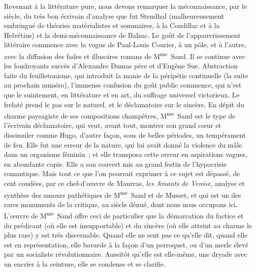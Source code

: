 \documentclass[french,twoside]{book} %
\begin{document}
Revenant à la littérature pure, nous devons remarquer la méconnaissance, par le siècle, du très bon écrivain d’analyse que fut Stendhal (malheureusement embringué de théories matérialistes et sommaires, à la Condillac et à la Helvétius) et la demi-méconnaissance de Balzac. Le goût de l’appauvrissement littéraire commence avec la vogue de Paul-Louis Courier, à un pôle, et à l’autre, avec la diffusion des fades et illusoires romans de M\textsuperscript{me} Sand. Il se continue avec les foudroyants succès d’Alexandre Dumas père et d’Eugène Sue. Abstraction faite du feuilletonisme, qui introduit la manie de la péripétie continuelle (la suite au prochain numéro), l’immense confusion du goût public commence, qui n’est que le suintement, en littérature et en art, du suffrage universel victorieux. Le frelaté prend le pas sur le naturel, et le déclamatoire sur le sincère. En dépit du charme paysagiste de ses compositions champêtres, M\textsuperscript{me} Sand est le type de l’écrivain déclamatoire, qui veut, avant tout, montrer son grand cœur et dissimuler comme Hugo, d’autre façon, sous de belles périodes, un tempérament de feu. Elle fut une erreur de la nature, qui lui avait donné la violence du mâle dans un organisme féminin ; et elle transposa cette erreur en aspirations vagues, en abondante copie. Elle a son couvert mis au grand festin de l’hypocrisie romantique. Mais tout ce que l’on pourrait exprimer à ce sujet est dépassé, de cent coudées, par ce chef-d’œuvre de Maurras, {\itshape les Amants de Venise}, analyse et synthèse des amours pathétiques de M\textsuperscript{me} Sand et de Musset, et qui est un des rares monuments de la critique, au siècle dénué, dont nous nous occupons ici. L’œuvre de M\textsuperscript{me} Sand offre ceci de particulier que la démarcation du factice et du prédicant (où elle est insupportable) et du sincère (où elle atteint au charme le plus rare) y est très discernable. Quand elle ne sent pas ce qu’elle dit, quand elle est en représentation, elle bavarde à la façon d’un perroquet, ou d’un merle élevé par un socialiste révolutionnaire. Aussitôt qu’elle est elle-même, une dryade avec un encrier à la ceinture, elle se condense et se clarifie.\par
\end{document}
